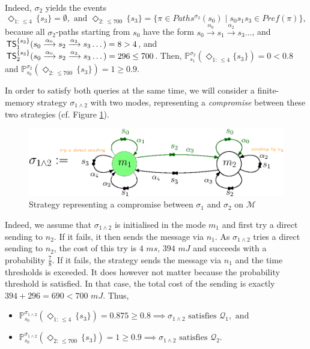 \begin{example}
  Indeed, $\sigma_2$ yields the events
  \[
    \Diamond_{1:\, \leq 4} \, \{s_3\} = \emptyset, \text{ and }
    \Diamond_{2:\, \leq 700} \, \{s_3\} = \{\pi \in Paths^{\sigma_2}(s_0) \; | \; s_0s_1s_3 \in Pref(\pi)\},
  \]
  because all $\sigma_2$-paths starting from $s_0$ have the form $s_0\xrightarrow{\alpha_0}s_1\xrightarrow{\alpha_2}s_3\dots$, and
  $\text{\sffamily TS}^{\{s_3\}}_1(s_0\xrightarrow{\alpha_0}s_2\xrightarrow{\alpha_2}s_3\dots) = 8 > 4$, and $\text{\sffamily TS}^{\{s_3\}}_2(s_0\xrightarrow{\alpha_0}s_2\xrightarrow{\alpha_2}s_3 \dots) = 296 \leq 700$. Then,
  $\mathbb{P}_{s_1}^{\sigma_2}(\Diamond_{1:\, \leq 4}\{s_3\}) = 0 < 0.8$ and $\mathbb{P}_{s_0}^{\sigma_2}(\Diamond_{2: \, \leq 700} \, \{s_3\}) = 1 \geq 0.9$.
  \par In order to satisfy both queries at the same
  time, we will consider a finite-memory strategy
  $\sigma_{1\wedge2}$ with two modes, representing
  a \textit{compromise} between these two strategies (cf.
  Figure \ref{strat-compromise}).
  \begin{figure}[h!]
    \centering
    \includegraphics[width=0.7\linewidth]{resources/strategy2}
    \caption{Strategy representing a compromise between $\sigma_1$ and $\sigma_2$ on $\mathcal{M}$}
    \label{strat-compromise}
  \end{figure}
  Indeed, we assume that $\sigma_{1 \wedge 2}$ is initialised in the mode $m_1$ and first try a direct sending to $n_2$. If it fails, it then sends the message via $n_1$.
  As $\sigma_{1 \wedge 2}$ tries a direct sending to $n_2$,
    the cost of this try is $4$ $ms$, $394$ $mJ$ and succeeds with a probability $\frac{7}{8}$. If it fails, the strategy sends the message via $n_1$ and the time thresholds is exceeded.
    It does however not matter because the probability threshold is satisfied.
    In that case, the total cost of the sending is exactly $394 + 296 = 690 < 700$ $mJ$. Thus,
  \begin{itemize}
    \item $\mathbb{P}_{s_0}^{\sigma_{1 \wedge 2}}(\Diamond_{1:\, \leq 4}\, \{s_3\}) = 0.875 \geq 0.8 \implies \sigma_{1 \wedge 2} \text{ satisfies }\mathcal{Q}_1, \text{ and}$
    \item $\mathbb{P}_{s_0}^{\sigma_{1 \wedge 2}}(\Diamond_{2:\, \leq 700}\, \{s_3\}) = 1 \geq 0.9 \implies \sigma_{1 \wedge 2} \text{ satisfies }\mathcal{Q}_2.$
  \end{itemize}
\end{example}
